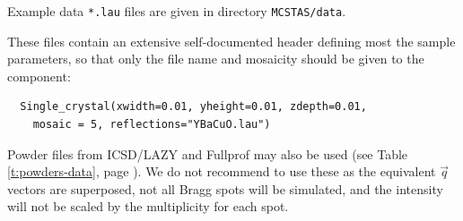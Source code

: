 Example data \verb+*.lau+ files are given in directory \verb+MCSTAS/data+.

These files contain an extensive self-documented header defining most the sample parameters, so that only the file name and mosaicity should be given to the component:
\begin{lstlisting}
  Single_crystal(xwidth=0.01, yheight=0.01, zdepth=0.01,
    mosaic = 5, reflections="YBaCuO.lau")
\end{lstlisting}

Powder files from ICSD/LAZY \cite{icsd_ill} and Fullprof \cite{Fullprof}
may also be used (see Table \ref{t:powders-data}, page \pageref{t:powders-data}).
We do not recommend to use these as the equivalent $\vec q$ vectors are superposed, not
all Bragg spots will be simulated, and the intensity will not be scaled by the
multiplicity for each spot.


